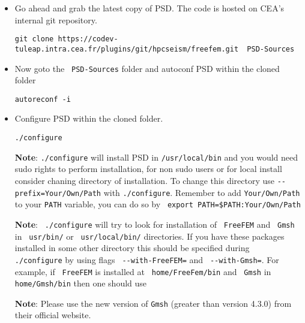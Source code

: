 \begin{itemize}
\item  Go ahead and grab the latest copy of PSD. The code is hosted on CEA's internal git repository.

\begin{lstlisting}[style=Linux]
git clone https://codev-tuleap.intra.cea.fr/plugins/git/hpcseism/freefem.git  PSD-Sources
\end{lstlisting}

\item  Now goto the \lstinline[style=Linux]! PSD-Sources! folder and autoconf PSD within the  cloned folder

\begin{lstlisting}[style=Linux]
autoreconf -i
\end{lstlisting}

\item Configure  PSD within the  cloned folder.
\begin{lstlisting}[style=Linux]
./configure
\end{lstlisting}
\textbf{Note}:  \lstinline[style=Linux]!./configure! will install PSD in \lstinline[style=Linux]!/usr/local/bin! and you would need sudo rights to perform installation, for non sudo users or for local install consider chaning directory of installation. To change this directory use \lstinline[style=Linux]!--prefix=Your/Own/Path! with \lstinline[style=Linux]!./configure!. Remember to add \lstinline[style=Linux]!Your/Own/Path! to your  \lstinline[style=Linux]!PATH! variable, you can do so by \lstinline[style=Linux]! export PATH=$PATH:Your/Own/Path!

\textbf{Note}:   \lstinline[style=Linux]! ./configure! will try to look for installation of \lstinline[style=Linux]! FreeFEM! and \lstinline[style=Linux]! Gmsh! in \lstinline[style=Linux]! usr/bin/! or \lstinline[style=Linux]! usr/local/bin/! directories. If you have these packages installed in some other directory this should be specified during \lstinline[style=Linux]! ./configure! by using flags \lstinline[style=Linux]! --with-FreeFEM=! and \lstinline[style=Linux]! --with-Gmsh=!. For example, if \lstinline[style=Linux]! FreeFEM! is installed at \lstinline[style=Linux]! home/FreeFem/bin! and \lstinline[style=Linux]! Gmsh! in \lstinline[style=Linux]!home/Gmsh/bin! then one should use

\textbf{Note}: Please use the new version of \lstinline[style=Linux]!Gmsh! (greater than version 4.3.0) from their official website.


\end{itemize}
